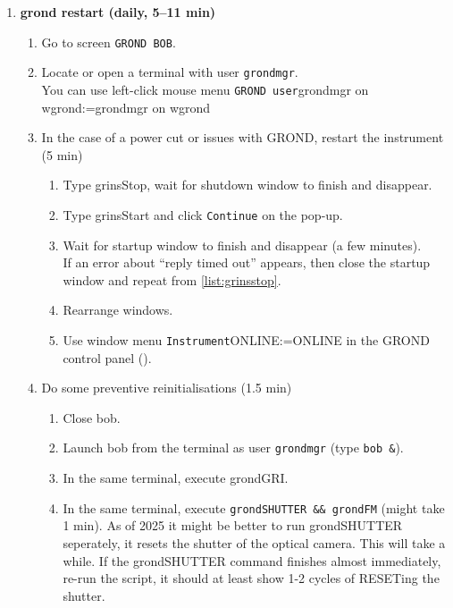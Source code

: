 \documentclass[11pt,fleqn,a4paper]{book}
\makeatletter
\def\menu#1#2{\texttt{#1}\ifx{}#2\else\@for\@x:=#2\do{$\rightarrow$\texttt{\@x}}\fi}
\def\wmenu#1#2{window menu \menu{#1}{#2}}
\def\mmenu#1#2{left-click mouse menu \menu{#1}{#2}}
\makeatother
\begin{document}
\begin{enumerate}
\begin{enumerate}
        \end{enumerate}
\bigskip%
  \item \textbf{\gls{grond} restart (daily, 5--11 min)}
        \label{list:grond}
        \begin{enumerate}
         \item Go to screen \texttt{GROND BOB}.
         \item Locate or open a terminal with user \texttt{grondmgr}.\\
               You can use \mmenu{GROND user}{grondmgr on \gls{wgrond}}
         \item In the case of a power cut or issues with GROND, restart the instrument (5 min)
         \begin{enumerate}
           \item Type \gls{grinsStop}, wait for shutdown window to finish and disappear.\label{list:grinsstop}
            \item Type \gls{grinsStart} and click \texttt{Continue} on the pop-up.
            \item Wait for startup window to finish and disappear (a few minutes).\\If an error about ``reply timed out'' appears, then close the startup window and repeat from \ref{list:grinsstop}.\label{list:grinsstart}
            \item Rearrange windows.
            \item Use \wmenu{Instrument}{ONLINE} in the GROND control panel ().\label{list:grondonline}
         \end{enumerate}
         \item Do some preventive reinitialisations (1.5 min)\label{list:grond-prophylaxis}
           \begin{enumerate}
             \item Close \gls{bob}.
             \item Launch \gls{bob} from the terminal as user \texttt{grondmgr} (type \texttt{bob \&}).
             \item In the same terminal, execute \gls{grondGRI}.
             \item In the same terminal, execute \texttt{\gls{grondSHUTTER} \&\& \gls{grondFM}} (might take 1 min). As of 2025 it might be better to run grondSHUTTER seperately, it resets the shutter of the optical camera. This will take a while. If the grondSHUTTER command finishes almost immediately, re-run the script, it should at least show 1-2 cycles of RESETing the shutter.

\end{enumerate}
\end{enumerate}
\end{enumerate}
\end{document}
